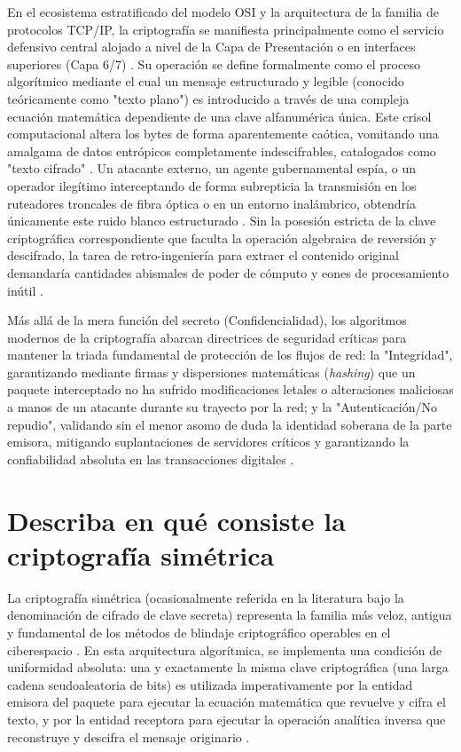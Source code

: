 \documentclass[a4paper,12pt]{article}
\begin{document}
En el ecosistema estratificado del modelo OSI y la arquitectura de la familia de protocolos TCP/IP, la criptografía se manifiesta principalmente como el servicio defensivo central alojado a nivel de la Capa de Presentación o en interfaces superiores (Capa 6/7) \cite{ibm_osi_layer6}. Su operación se define formalmente como el proceso algorítmico mediante el cual un mensaje estructurado y legible (conocido teóricamente como "texto plano") es introducido a través de una compleja ecuación matemática dependiente de una clave alfanumérica única. Este crisol computacional altera los bytes de forma aparentemente caótica, vomitando una amalgama de datos entrópicos completamente indescifrables, catalogados como "texto cifrado" \cite{sentinel_enc, ibm_crypto_use}. Un atacante externo, un agente gubernamental espía, o un operador ilegítimo interceptando de forma subrepticia la transmisión en los ruteadores troncales de fibra óptica o en un entorno inalámbrico, obtendría únicamente este ruido blanco estructurado \cite{sentinel_enc}. Sin la posesión estricta de la clave criptográfica correspondiente que faculta la operación algebraica de reversión y descifrado, la tarea de retro-ingeniería para extraer el contenido original demandaría cantidades abismales de poder de cómputo y eones de procesamiento inútil \cite{ibm_crypto_use, sentinel_enc}.

Más allá de la mera función del secreto (Confidencialidad), los algoritmos modernos de la criptografía abarcan directrices de seguridad críticas para mantener la triada fundamental de protección de los flujos de red: la "Integridad", garantizando mediante firmas y dispersiones matemáticas (\textit{hashing}) que un paquete interceptado no ha sufrido modificaciones letales o alteraciones maliciosas a manos de un atacante durante su trayecto por la red; y la "Autenticación/No repudio", validando sin el menor asomo de duda la identidad soberana de la parte emisora, mitigando suplantaciones de servidores críticos y garantizando la confiabilidad absoluta en las transacciones digitales \cite{redes_crypto, aws_ssl}.

\section{Describa en qué consiste la criptografía simétrica}

La criptografía simétrica (ocasionalmente referida en la literatura bajo la denominación de cifrado de clave secreta) representa la familia más veloz, antigua y fundamental de los métodos de blindaje criptográfico operables en el ciberespacio \cite{keyfactor_sym, ibm_crypto_types}. En esta arquitectura algorítmica, se implementa una condición de uniformidad absoluta: una y exactamente la misma clave criptográfica (una larga cadena seudoaleatoria de bits) es utilizada imperativamente por la entidad emisora del paquete para ejecutar la ecuación matemática que revuelve y cifra el texto, y por la entidad receptora para ejecutar la operación analítica inversa que reconstruye y descifra el mensaje originario \cite{redes_crypto, ibm_crypto_types}.
\end{document}
